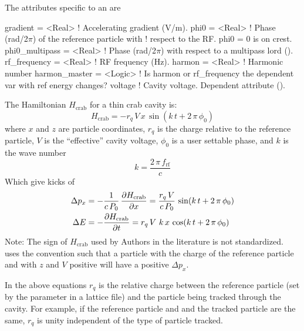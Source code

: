 The attributes specific to an  are 
\begin{example}
  gradient        = <Real>    ! Accelerating gradient (V/m).
  phi0            = <Real>    ! Phase (rad/2\(\pi\)) of the reference particle with 
                              !   respect to the RF. phi0 = 0 is on crest.
  phi0_multipass  = <Real>    ! Phase (rad/2\(\pi\)) with respect to a multipass lord ().
  rf_frequency    = <Real>    ! RF frequency (Hz).
  harmon          = <Real>    ! Harmonic number
  harmon_master   = <Logic>   ! Is harmon or rf_frequency the dependent var with ref energy changes?
  voltage                     ! Cavity voltage. Dependent attribute ().
\end{example}

The Hamiltonian  $H_{\text{crab}}$ for a thin crab cavity is\cite{b:crab1}:
\begin{equation}
  H_{\text{crab}} = -r_q \, V\, x \, \sin(k \, t + 2 \, \pi \, \phi_0)
\end{equation}
where $x$ and $z$ are particle coordinates, $r_q$ is the charge relative to the reference
particle, $V$ is the ``effective'' cavity voltage, $\phi_0$ is a user settable
phase, and $k$ is the wave number
\begin{equation}
  k = \frac{2 \, \pi \, f_{\text{rf}}}{c}
\end{equation}
Which give kicks of
\begin{align} 
  \Delta p_x &= -\frac{1}{c \, P_0} \, \frac{\partial H_{\text{crab}}}{\partial x} = 
    \frac{r_q \, V}{c \, P_0} \, \sin(k \, t + 2 \, \pi \, \phi_0) \nonumber \\ 
  \Delta E &= -\frac{\partial H_{\text{crab}}}{\partial t} = 
    r_q \, V \, \, k \, x \, \cos(k \, t + 2 \, \pi \, \phi_0) 
\end{align} 
Note: The sign of $H_{\text{crab}}$ used by Authors in the literature is not standardized. \bmad
uses the convention such that a particle with the charge of the reference particle and with $z$ and
$V$ positive will have a positive $\Delta p_x$.

In the above equations $r_q$ is the relative charge between the reference particle (set by the
 parameter in a lattice file) and the particle being tracked through the
cavity. For example, if the reference particle and and the tracked particle are the same, $r_q$ is
unity independent of the type of particle tracked.

